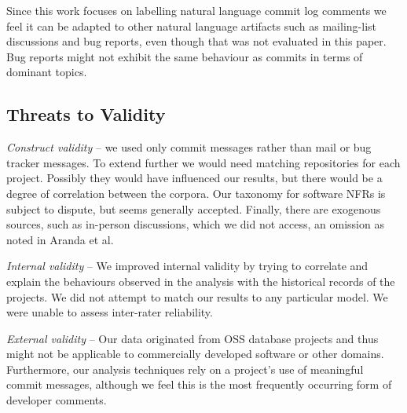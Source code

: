 \documentclass[smallextended]{svjour3}       %
\begin{document}
Since this work focuses on labelling natural language commit log
comments we feel it can be adapted to other natural language artifacts
such as mailing-list discussions and bug reports, even though that was
not evaluated in this paper. Bug reports might not exhibit the same
behaviour as commits in terms of dominant topics.

\subsection{Threats to Validity}
\emph{Construct validity} -- we used only commit messages rather than
mail or bug tracker messages. 
To extend further we would need matching repositories for each project.
Possibly they would have influenced our results, but there would be a degree of correlation between the corpora.
Our taxonomy for software NFRs is subject to dispute, but seems
generally accepted. Finally, there are exogenous sources, such as
in-person discussions, which we did not access, an omission as noted
in Aranda et al.~\cite{aranda09icse} %

\emph{Internal validity} -- %
We improved internal validity by trying to correlate and explain the behaviours observed in the analysis with the historical records of the projects.
We did not attempt to match our results to any particular model.
We were unable to assess inter-rater reliability.

\emph{External validity} -- %
Our data originated from OSS database projects and thus might not be applicable to commercially developed software or other domains. 
Furthermore, our analysis techniques rely on a project's use of meaningful commit messages, although we feel this is the most frequently occurring form of developer comments. 
\end{document}
